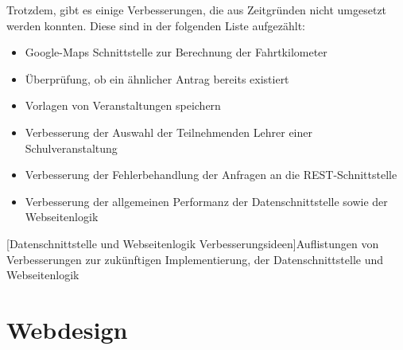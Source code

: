 Trotzdem, gibt es einige Verbesserungen, die aus Zeitgründen nicht umgesetzt werden konnten. Diese sind in der folgenden Liste aufgezählt:
\begin{itemize}
	\item Google-Maps Schnittstelle zur Berechnung der Fahrtkilometer
	\item Überprüfung, ob ein ähnlicher Antrag bereits existiert
	\item Vorlagen von Veranstaltungen speichern
	\item Verbesserung der Auswahl der Teilnehmenden Lehrer einer Schulveranstaltung
	\item Verbesserung der Fehlerbehandlung der Anfragen an die REST-Schnittstelle
	\item Verbesserung der allgemeinen Performanz der Datenschnittstelle sowie der Webseitenlogik
\end{itemize}
[Datenschnittstelle und Webseitenlogik Verbesserungsideen]{Auflistungen von Verbesserungen zur zukünftigen Implementierung, der Datenschnittstelle und Webseitenlogik}
\section{Webdesign}
